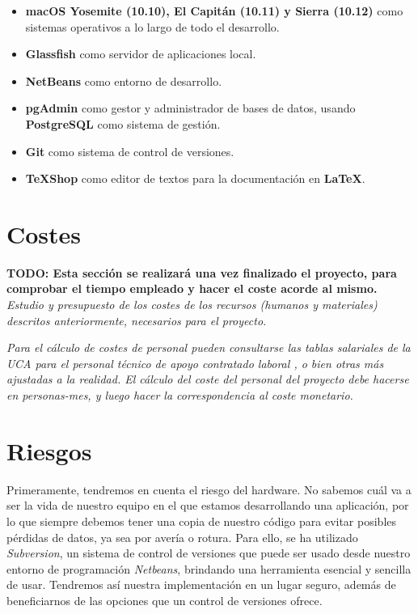 \begin{itemize}
\item \textbf{macOS Yosemite (10.10), El Capitán (10.11) y Sierra (10.12)} como sistemas operativos a lo largo de todo el desarrollo.
\item \textbf{Glassfish} como servidor de aplicaciones local.
\item \textbf{NetBeans} como entorno de desarrollo.
\item \textbf{pgAdmin} como gestor y administrador de bases de datos, usando \textbf{PostgreSQL} como sistema de gestión.
\item \textbf{Git} como sistema de control de versiones.
\item \textbf{TeXShop} como editor de textos para la documentación en \textbf{LaTeX}.
\end{itemize}


\section{Costes}

\textbf{TODO: Esta sección se realizará una vez finalizado el proyecto, para comprobar el tiempo empleado y hacer el coste acorde al mismo.}
\\

\textit{Estudio y presupuesto de los costes de los recursos (humanos y materiales) descritos anteriormente, necesarios para el proyecto.}

\textit{Para el cálculo de costes de personal pueden consultarse las tablas salariales de la UCA para el personal técnico de apoyo contratado laboral \cite{paslaboral}, o bien otras más ajustadas a la realidad. El cálculo del coste del personal del proyecto debe hacerse en personas-mes, y luego hacer la correspondencia al coste monetario.}


\section{Riesgos}

Primeramente, tendremos en cuenta el riesgo del hardware. No sabemos cuál va a ser la vida de nuestro equipo en el que estamos desarrollando una aplicación, por lo que siempre debemos tener una copia de nuestro código para evitar posibles pérdidas de datos, ya sea por avería o rotura. Para ello, se ha utilizado \textit{Subversion}, un sistema de control de versiones que puede ser usado desde nuestro entorno de programación \textit{Netbeans}, brindando una herramienta esencial y sencilla de usar. Tendremos así nuestra implementación en un lugar seguro, además de beneficiarnos de las opciones que un control de versiones ofrece.
\\

